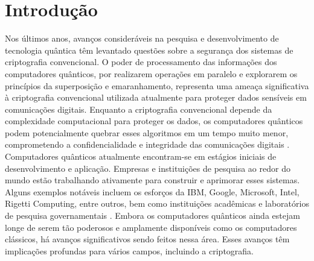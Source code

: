 
\chapter{Introdução}\label{cap:introducao}

Nos últimos anos, avanços consideráveis na pesquisa e desenvolvimento de tecnologia quântica têm levantado questões sobre a segurança dos sistemas de criptografia convencional. O poder de processamento das informações dos computadores quânticos, por realizarem operações em paralelo e explorarem os princípios da superposição e emaranhamento, representa uma ameaça significativa à criptografia convencional utilizada atualmente para proteger dados sensíveis em comunicações digitais. Enquanto a criptografia convencional depende da complexidade computacional para proteger os dados, os computadores quânticos podem potencialmente quebrar esses algoritmos em um tempo muito menor, comprometendo a confidencialidade e integridade das comunicações digitais \cite{mitra2017quantum}. Computadores quânticos atualmente encontram-se em estágios iniciais de desenvolvimento e aplicação. Empresas e instituições de pesquisa ao redor do mundo estão trabalhando ativamente para construir e aprimorar esses sistemas. Alguns exemplos notáveis incluem os esforços da IBM, Google, Microsoft, Intel, Rigetti Computing, entre outros, bem como instituições acadêmicas e laboratórios de pesquisa governamentais \cite{nandhini2022extensive}. Embora os computadores quânticos ainda estejam longe de serem tão poderosos e amplamente disponíveis como os computadores clássicos, há avanços significativos sendo feitos nessa área. Esses avanços têm implicações profundas para vários campos, incluindo a criptografia.

